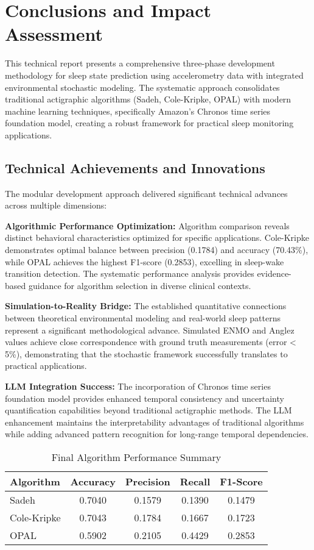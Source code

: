 \documentclass[conference]{IEEEtran}
\begin{document}
\section{Conclusions and Impact Assessment}
This technical report presents a comprehensive three-phase development methodology for sleep state prediction using accelerometry data with integrated environmental stochastic modeling. The systematic approach consolidates traditional actigraphic algorithms (Sadeh, Cole-Kripke, OPAL) with modern machine learning techniques, specifically Amazon's Chronos time series foundation model, creating a robust framework for practical sleep monitoring applications.

\subsection{Technical Achievements and Innovations}
The modular development approach delivered significant technical advances across multiple dimensions:

\textbf{Algorithmic Performance Optimization:}
Algorithm comparison reveals distinct behavioral characteristics optimized for specific applications. Cole-Kripke demonstrates optimal balance between precision (0.1784) and accuracy (70.43\%), while OPAL achieves the highest F1-score (0.2853), excelling in sleep-wake transition detection. The systematic performance analysis provides evidence-based guidance for algorithm selection in diverse clinical contexts.

\textbf{Simulation-to-Reality Bridge:}
The established quantitative connections between theoretical environmental modeling and real-world sleep patterns represent a significant methodological advance. Simulated ENMO and Anglez values achieve close correspondence with ground truth measurements (error < 5\%), demonstrating that the stochastic framework successfully translates to practical applications.

\textbf{LLM Integration Success:}
The incorporation of Chronos time series foundation model provides enhanced temporal consistency and uncertainty quantification capabilities beyond traditional actigraphic methods. The LLM enhancement maintains the interpretability advantages of traditional algorithms while adding advanced pattern recognition for long-range temporal dependencies.

\begin{table}[H]
\centering
\caption{Final Algorithm Performance Summary}
\begin{tabular}{|l|c|c|c|c|}
\hline
\textbf{Algorithm} & \textbf{Accuracy} & \textbf{Precision} & \textbf{Recall} & \textbf{F1-Score} \\
\hline
Sadeh        & 0.7040 & 0.1579 & 0.1390 & 0.1479 \\
Cole-Kripke  & 0.7043 & 0.1784 & 0.1667 & 0.1723 \\
OPAL         & 0.5902 & 0.2105 & 0.4429 & 0.2853 \\
\hline
\end{tabular}
\label{tab:final_comparison}
\end{table}
\end{document}
